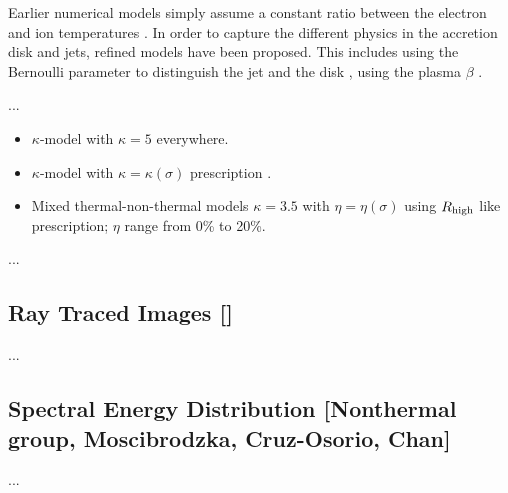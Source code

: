 \documentclass[twocolumn,tighten,dvipsnames]{aastex63}
\begin{document}
Earlier numerical models simply assume a constant ratio between the
electron and ion temperatures \citep{...}.
In order to capture the different physics in the accretion disk and
jets, refined models have been proposed.
This includes using the Bernoulli parameter to distinguish the jet and
the disk \citep{2014A&A...570A...7M}, using the plasma $\beta$
\citep{2015ApJ...799....1C, 2015ApJ...812..103C}.

...

\begin{itemize}
\item $\kappa$-model with $\kappa = 5$ everywhere.
\item $\kappa$-model with $\kappa = \kappa(\sigma)$ prescription
  \citep{2016ApJ...826...77B}.
\item Mixed thermal-non-thermal models $\kappa = 3.5$ with $\eta =
  \eta(\sigma)$ using ${R_\mathrm{high}}$ like prescription; $\eta$ range from 0\%
  to 20\%.
\end{itemize}

...

\subsection{Ray Traced Images
  []}
\label{sec:images}

...

\subsection{Spectral Energy Distribution
  [Nonthermal group, Moscibrodzka, Cruz-Osorio, Chan]}
\label{sec:SED}

...



\end{document}

